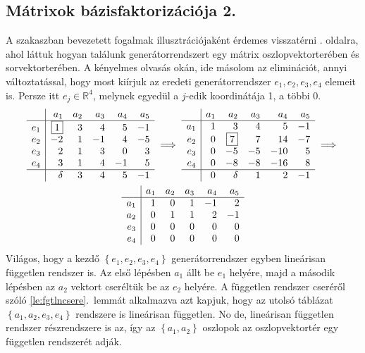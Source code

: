 \documentclass[a4paper, showtrims]{memoir}
\theoremstyle{plain}
\theoremstyle{remark}
\theoremstyle{definition}
\begin{document}
\subsection{Mátrixok bázisfaktorizációja 2.}
A szakaszban bevezetett fogalmak illusztrációjaként érdemes visszatérni \aazt{\pageref{bazisfakt}}. oldalra,
ahol láttuk hogyan találunk generátorrendszert egy mátrix oszlopvektorterében és sorvektorterében.
A kényelmes olvasás okán, ide másolom az eliminációt, annyi változtatással, hogy 
most kiírjuk az eredeti generátorrendszer $e_1,e_2,e_3,e_4$ elemeit is.
Persze itt $e_j\in\mathbb{R}^4$, melynek egyedül a $j$-edik koordinátája 1, a többi 0.
\begin{multline*}
    \begin{array}{r|rrrrr}
         & a_1       & a_2 & a_3 & a_4 & a_5 \\
        \hline
      e_1   & \boxed{1} & 3   & 4   & 5   & -1  \\
      e_2   & -2        & 1   & -1  & 4   & -5  \\
      e_3   & 2         & 1   & 3   & 0   & 3   \\
      e_4   & 3         & 1   & 4   & -1  & 5   \\
        \hline
         & \delta    & 3   & 4   & 5   & -1
    \end{array}
    \implies
    \begin{array}{r|rrrrr}
            & a_1 & a_2       & a_3 & a_4 & a_5 \\
        \hline
        a_1 & 1   & 3         & 4   & 5   & -1  \\
        e_2 & 0   & \boxed{7} & 7   & 14  & -7  \\
        e_3 & 0   & -5        & -5  & -10 & 5   \\
        e_4 & 0   & -8        & -8  & -16 & 8   \\
        \hline
            & 0   & \delta    & 1   & 2   & -1
    \end{array}
    \implies
    \\
    \begin{array}{r|rrrrr}
            & a_1 & a_2 & a_3 & a_4 & a_5 \\
        \hline
        a_1 & 1   & 0   & 1   & -1  & 2   \\
        a_2 & 0   & 1   & 1   & 2   & -1  \\
        e_3 & 0   & 0   & 0   & 0   & 0   \\
        e_4 & 0   & 0   & 0   & 0   & 0
    \end{array}
\end{multline*}
Világos, hogy a kezdő $\left\{ e_1,e_2,e_3,e_4 \right\}$
generátorrendszer egyben lineárisan független rendszer is.
Az első lépésben $a_1$ állt be $e_1$ helyére, 
majd a második lépésben az $a_2$ vektort cseréltük be az $e_2$ helyére.
A független rendszer cseréről szóló \ref{le:fgtlncsere}.~lemmát alkalmazva azt kapjuk, hogy az utolsó táblázat $\left\{ a_1,a_2,e_3,e_4 \right\}$ rendszere is lineárisan független.
No de, lineárisan független rendszer részrendszere is az, 
így az $\left\{ a_1,a_2 \right\}$ oszlopok az oszlopvektortér egy független rendszerét adják.
\end{document}
